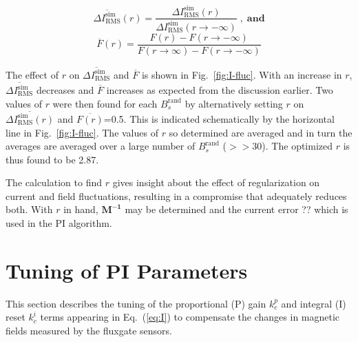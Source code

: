 \begin{equation}\label{eq:Inorm}
    \overline{\Delta I_{\text{RMS}}^{\text{sim}}}(r)=\frac{\Delta I_{\text{RMS}}^{\text{sim}}(r)}{\Delta I_{\text{RMS}}^{\text{sim}}(r\rightarrow - \infty)} \;\mathbf{,\;and}
\end{equation}
\begin{equation}\label{eq:flucNorm}
    \overline{F}(r)=\frac{F(r)- F(r\rightarrow - \infty)}{F(r\rightarrow \infty)- F(r\rightarrow - \infty)}
\end{equation}


\FloatBarrier
The effect of $r$ on $\overline{\Delta I_{\text{RMS}}^{\text{sim}}}$ and $\overline{F}$ is shown in Fig.~\ref{fig:I-fluc}. With an increase in $r$, $\overline{\Delta I_{\text{RMS}}^{\text{sim}}}$ decreases and $\overline{F}$ increases as expected from the discussion earlier.
Two values of $r$ were then found for each $B_s^{\text{rand}}$ by alternatively setting $r$ on $\overline{\Delta I_{\text{RMS}}^{\text{sim}}(r)}$ and $\overline{F(r)}$=0.5. This is indicated schematically by the horizontal line in Fig.~\ref{fig:I-fluc}. The values of $r$ so determined are averaged and in turn the averages are averaged over a large number of $B_s^{\text{rand}}$ ($>>$30). The optimized $r$ is thus found to be 2.87.

The calculation to find $r$ gives insight about the effect of regularization on current and field fluctuations, resulting in a compromise that adequately reduces both. With $r$ in hand, $\bm{M^{-1}}$ may be determined and the current error  ?? which is used in the PI algorithm.

\section{Tuning of PI Parameters}\label{sec:tune}
This section describes the tuning of the proportional (P) gain $k_c^p$ and integral (I) reset $k_c^i$ terms appearing in Eq.~(\ref{eq:I}) to compensate the changes in magnetic fields measured by the fluxgate sensors.

